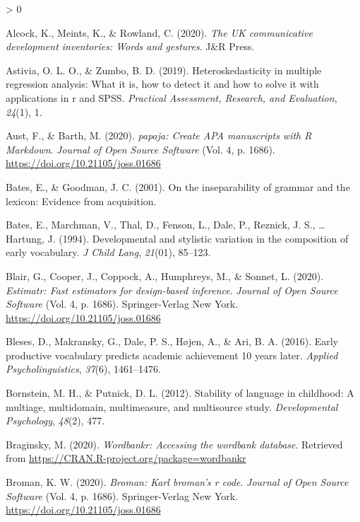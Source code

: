 \documentclass[
  english,
  ,man,floatsintext]{apa6}
\newlength{\cslhangindent}
\newenvironment{CSLReferences}[2] %
 {%
  \setlength{\parindent}{0pt}
  \ifodd #1 \everypar{\setlength{\hangindent}{\cslhangindent}}\ignorespaces\fi
  \ifnum #2 > 0
  \setlength{\parskip}{#2\baselineskip}
  \fi
 }%
 {}
\begin{document}
\hypertarget{refs}{}
\begin{CSLReferences}{1}{0}
\leavevmode\hypertarget{ref-Alcock2020}{}%
Alcock, K., Meints, K., \& Rowland, C. (2020). \emph{The UK communicative development inventories: Words and gestures}. J\&R Press.

\leavevmode\hypertarget{ref-Astivia2019}{}%
Astivia, O. L. O., \& Zumbo, B. D. (2019). Heteroskedasticity in multiple regression analysis: What it is, how to detect it and how to solve it with applications in r and SPSS. \emph{Practical Assessment, Research, and Evaluation}, \emph{24}(1), 1.

\leavevmode\hypertarget{ref-R-papaja}{}%
Aust, F., \& Barth, M. (2020). \emph{{papaja}: {Create} {APA} manuscripts with {R Markdown}}. \emph{Journal of Open Source Software} (Vol. 4, p. 1686). \url{https://doi.org/10.21105/joss.01686}

\leavevmode\hypertarget{ref-Bates2001}{}%
Bates, E., \& Goodman, J. C. (2001). On the inseparability of grammar and the lexicon: Evidence from acquisition.

\leavevmode\hypertarget{ref-bates1994}{}%
Bates, E., Marchman, V., Thal, D., Fenson, L., Dale, P., Reznick, J. S., \ldots{} Hartung, J. (1994). Developmental and stylistic variation in the composition of early vocabulary. \emph{J Child Lang}, \emph{21}(01), 85--123.

\leavevmode\hypertarget{ref-R-estimatr}{}%
Blair, G., Cooper, J., Coppock, A., Humphreys, M., \& Sonnet, L. (2020). \emph{Estimatr: Fast estimators for design-based inference}. \emph{Journal of Open Source Software} (Vol. 4, p. 1686). Springer-Verlag New York. \url{https://doi.org/10.21105/joss.01686}

\leavevmode\hypertarget{ref-Bleses2016}{}%
Bleses, D., Makransky, G., Dale, P. S., Højen, A., \& Ari, B. A. (2016). Early productive vocabulary predicts academic achievement 10 years later. \emph{Applied Psycholinguistics}, \emph{37}(6), 1461--1476.

\leavevmode\hypertarget{ref-bornstein2012}{}%
Bornstein, M. H., \& Putnick, D. L. (2012). Stability of language in childhood: A multiage, multidomain, multimeasure, and multisource study. \emph{Developmental Psychology}, \emph{48}(2), 477.

\leavevmode\hypertarget{ref-R-wordbankr}{}%
Braginsky, M. (2020). \emph{Wordbankr: Accessing the wordbank database}. Retrieved from \url{https://CRAN.R-project.org/package=wordbankr}

\leavevmode\hypertarget{ref-R-broman}{}%
Broman, K. W. (2020). \emph{Broman: Karl broman's r code}. \emph{Journal of Open Source Software} (Vol. 4, p. 1686). Springer-Verlag New York. \url{https://doi.org/10.21105/joss.01686}


\end{CSLReferences}
\end{document}
